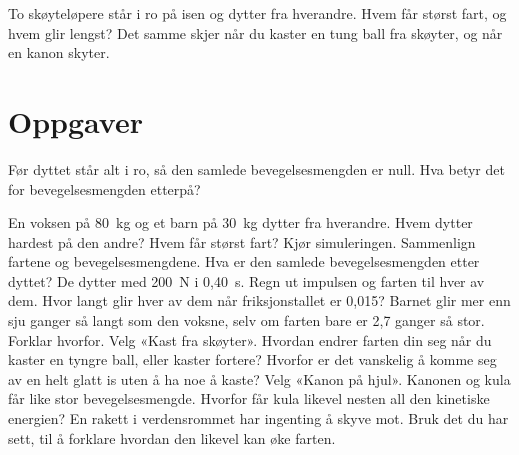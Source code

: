 \documentclass[11pt]{article}
\begin{document}

To skøyteløpere står i ro på isen og dytter fra hverandre. Hvem får størst fart, og hvem glir lengst? Det samme skjer når du kaster en tung ball fra skøyter, og når en kanon skyter.

\section*{Oppgaver}

Før dyttet står alt i ro, så den samlede bevegelsesmengden er null. Hva betyr det for bevegelsesmengden etterpå?

\begin{oppgaveliste}
\oppgave {}En voksen på 80~kg og et barn på 30~kg dytter fra hverandre. Hvem dytter hardest på den andre? Hvem får størst fart?
\svar
\oppgave {}Kjør simuleringen. Sammenlign fartene og bevegelsesmengdene. Hva er den samlede bevegelsesmengden etter dyttet?
\svar
\oppgave {}De dytter med 200~N i 0,40~s. Regn ut impulsen og farten til hver av dem. Hvor langt glir hver av dem når friksjonstallet er 0,015?
\svar
\oppgave {}Barnet glir mer enn sju ganger så langt som den voksne, selv om farten bare er 2,7 ganger så stor. Forklar hvorfor.
\svar
\oppgave {}Velg «Kast fra skøyter». Hvordan endrer farten din seg når du kaster en tyngre ball, eller kaster fortere? Hvorfor er det vanskelig å komme seg av en helt glatt is uten å ha noe å kaste?
\svar
\oppgave {}Velg «Kanon på hjul». Kanonen og kula får like stor bevegelsesmengde. Hvorfor får kula likevel nesten all den kinetiske energien?
\svar
\oppgave {}En rakett i verdensrommet har ingenting å skyve mot. Bruk det du har sett, til å forklare hvordan den likevel kan øke farten.
\svar
\end{oppgaveliste}
\end{document}
